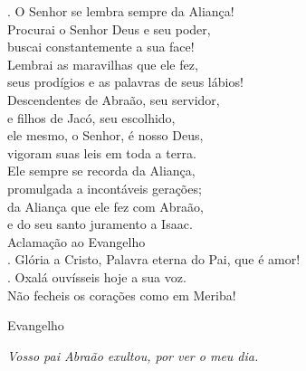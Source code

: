 \documentclass{book}
\begin{document}
\begin{flushleft}
    {\color{VioletRed2} \Rbar.} O Senhor se lembra sempre da Aliança!
    \vspace{.2cm} \\
    Procurai o Senhor Deus e seu poder, \textsuperscript{\gresixstar{}} \\
    buscai constantemente a sua face! \\
    Lembrai as maravilhas que ele fez, \textsuperscript{\gresixstar{}} \\
    seus prodígios e as palavras de seus lábios!
    \vspace{.2cm} \\
    Descendentes de Abraão, seu servidor, \textsuperscript{\gresixstar{}} \\
    e filhos de Jacó, seu escolhido, \\
    ele mesmo, o Senhor, é nosso Deus, \textsuperscript{\gresixstar{}} \\
    vigoram suas leis em toda a terra.
    \vspace{.2cm} \\
    Ele sempre se recorda da Aliança, \textsuperscript{\gresixstar{}} \\
    promulgada a incontáveis gerações; \\
    da Aliança que ele fez com Abraão, \textsuperscript{\gresixstar{}} \\
    e do seu santo juramento a Isaac.
    \vspace{.2cm} \\
    \textcolor{VioletRed2}{Aclamação ao Evangelho}
    \vspace{.2cm} \\
    {\color{VioletRed2} \Rbar.} Glória a Cristo, Palavra eterna do Pai, que é amor! \\
    {\color{VioletRed2} \Vbar.} Oxalá ouvísseis hoje a sua voz. \\
    Não fecheis os corações como em Meriba!
\end{flushleft}
\begin{center}
    \textcolor{VioletRed2}{Evangelho}
\end{center}
\begin{flushright}
    \textit{Vosso pai Abraão exultou, por ver o meu dia.}
\end{flushright}
\end{document}
